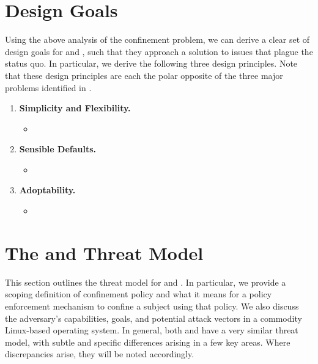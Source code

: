 \section{Design Goals}%
\label{s:cp-design}

Using the above analysis of the confinement problem, we can derive a clear set of design
goals for \bpfbox{} and \bpfcontain{}, such that they approach a solution to issues that
plague the status quo. In particular, we derive the following three design principles.
Note that these design principles are each the polar opposite of the three major problems
identified in .

\begin{enumerate}
  \item \textbf{Simplicity and Flexibility.}
  \begin{inprogress}
    \begin{itemize}
      \item
    \end{itemize}
  \end{inprogress}

  \item \textbf{Sensible Defaults.}
  \begin{inprogress}
    \begin{itemize}
      \item
    \end{itemize}
  \end{inprogress}

  \item \textbf{Adoptability.}
  \begin{inprogress}
    \begin{itemize}
      \item
    \end{itemize}
  \end{inprogress}
\end{enumerate}





\section{The \bpfbox{} and \bpfcontain{} Threat Model}%
\label{s:cp-threat-model}

This section outlines the threat model for \bpfbox{} and \bpfcontain{}. In particular, we
provide a scoping definition of confinement policy and what it means for a policy
enforcement mechanism to confine a subject using that policy. We also discuss the
adversary's capabilities, goals, and potential attack vectors in a commodity Linux-based
operating system. In general, both \bpfbox{} and \bpfcontain{} have a very similar threat
model, with subtle and specific differences arising in a few key areas. Where
discrepancies arise, they will be noted accordingly.

